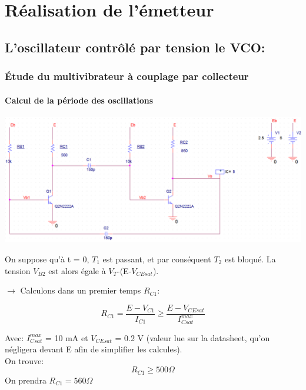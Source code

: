 \documentclass[a4paper]{report}
\begin{document}
\chapter{Réalisation de l'émetteur}

\section{L'oscillateur contrôlé par tension le VCO:}

\subsection{Étude du multivibrateur à couplage par collecteur}

\subsubsection{Calcul de la période des oscillations}
\begin{center}
\includegraphics[width=1\textwidth]{multivib.PNG}
\end{center}


On suppose qu'à t = 0, $T_1$ est passant, et par conséquent $T_2$ est bloqué. La tension $V_{B2}$ est alors égale à $V_T$-(E-$V_{CEsat}$). \\
\vspace{0.4cm}

$\rightarrow$ Calculons dans un premier temps $R_{C1}$:

$$R_{C1} = \dfrac{E-V_{C1}}{I_{C1}} \geq \dfrac{E-V_{CEsat}}{I_{Csat}^{max}}$$

Avec: $I_{Csat}^{max}$ = 10 mA et $V_{CEsat}$ = 0.2 V (valeur lue sur la datasheet, qu'on négligera devant E afin de simplifier les calcules).\\
On trouve:
$$R_{C1} \geq 500 \Omega$$
On prendra \hspace{5.3cm} $R_{C1} = 560 \Omega$ \\
\end{document}
